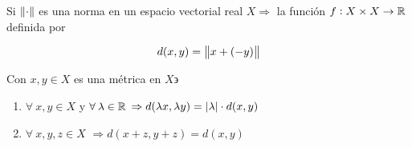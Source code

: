 \begin{theorem}\label{theom1}
    Si $\norm{\cdot}$ es una norma en un espacio vectorial real $X \Rightarrow$ la función $f : X \times X \to \mathbb{R}$ definida por

    \begin{equation*}
        d(x,y) = \norm{x+(-y)}
    \end{equation*}

    Con $x,y \in X$ es una métrica en $X \backepsilon$

    \begin{enumerate}[label=\alph*)]
    \item $\forall \: x, y \in X$ y $\forall \: \lambda \in \mathbb{R}$ $\Rightarrow d(\lambda x, \lambda y) = \abs{\lambda} \cdot d(x,y)$
    \item  $\forall \: x, y, z \in X$ $\Rightarrow d(x+z, y+z) = d(x,y)$
    \end{enumerate}
\end{theorem}

